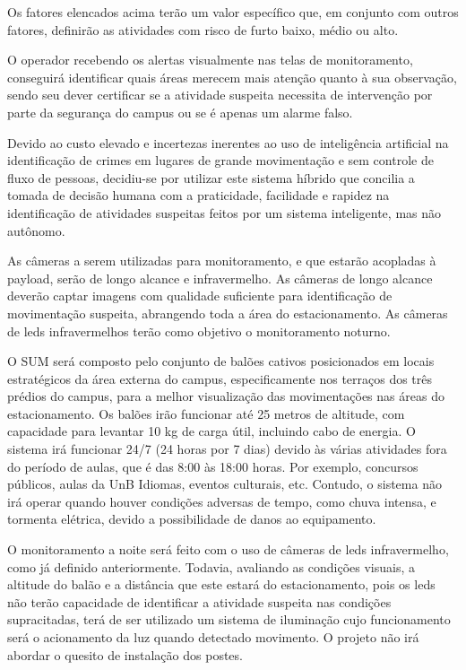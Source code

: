   Os fatores elencados acima terão um valor específico que, em conjunto com outros fatores, definirão as atividades com risco de furto baixo, médio ou alto.

  O operador recebendo os alertas visualmente nas telas de monitoramento, conseguirá identificar quais áreas merecem mais atenção quanto à sua observação, sendo seu dever certificar se a atividade suspeita necessita de intervenção por parte da segurança do campus ou se é apenas um alarme falso.

  Devido ao custo elevado e incertezas inerentes ao uso de inteligência artificial na identificação de crimes em lugares de grande movimentação e sem controle de fluxo de pessoas, decidiu-se por utilizar este sistema híbrido que concilia a tomada de decisão humana com a praticidade, facilidade e rapidez na identificação de atividades suspeitas feitos por um sistema inteligente, mas não autônomo.

  As câmeras a serem utilizadas para monitoramento, e que estarão acopladas à payload, serão de longo alcance e infravermelho.  As câmeras de longo alcance deverão captar imagens com qualidade suficiente para identificação de movimentação suspeita, abrangendo toda a área do estacionamento. As câmeras de leds infravermelhos terão como objetivo o monitoramento noturno.

  O SUM será composto pelo conjunto de balões cativos posicionados em locais estratégicos da área externa do campus, especificamente nos terraços dos três prédios do campus, para a melhor visualização das movimentações nas áreas do estacionamento. Os balões irão funcionar até 25 metros de altitude, com capacidade para levantar 10 kg de carga útil, incluindo cabo de energia. O sistema irá funcionar 24/7 (24 horas por 7 dias) devido às várias atividades fora do período de aulas, que é das 8:00 às 18:00 horas. Por exemplo, concursos públicos, aulas da UnB Idiomas, eventos culturais, etc. Contudo, o sistema não irá operar quando houver condições adversas de tempo, como chuva intensa, e tormenta elétrica, devido a possibilidade de danos ao equipamento.

  O monitoramento a noite será feito com o uso de câmeras de leds infravermelho, como já definido anteriormente. Todavia, avaliando as condições visuais, a altitude do balão e a distância que este estará do estacionamento, pois os leds não terão capacidade  de identificar a atividade suspeita nas condições supracitadas, terá de ser utilizado um sistema de iluminação cujo funcionamento será o acionamento da luz quando detectado movimento. O projeto não irá abordar o quesito de instalação dos postes.

